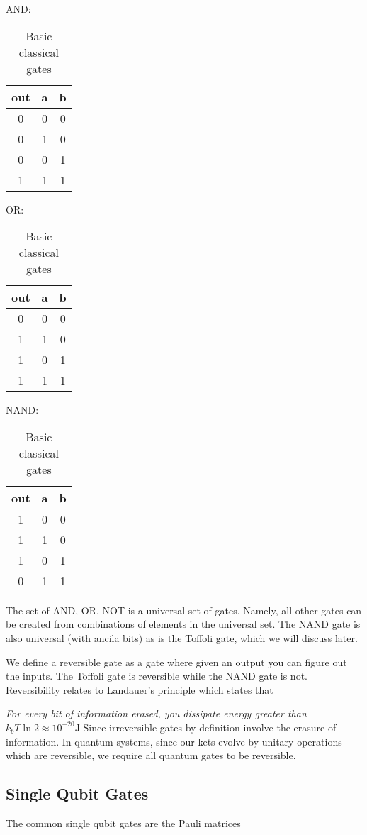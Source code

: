 \documentclass[11pt]{article} %
\begin{document}
\begin{table}
    \centering
    AND: 
    \begin{tabular}{c|c c}
        out & a & b\\\hline
        0 & 0 & 0\\
        0 & 1 & 0\\
        0 & 0 & 1\\
        1 & 1 & 1\\
    \end{tabular}\;\;
    OR: 
    \begin{tabular}{c|c c}
        out & a & b\\\hline
        0 & 0 & 0\\
        1 & 1 & 0\\
        1 & 0 & 1\\
        1 & 1 & 1\\
    \end{tabular}\;\;
    NAND: 
    \begin{tabular}{c|c c}
        out & a & b\\\hline
        1 & 0 & 0\\
        1 & 1 & 0\\
        1 & 0 & 1\\
        0 & 1 & 1\\
    \end{tabular}
    \caption{Basic classical gates}
    \label{basic_gates}
\end{table}

The set of {AND, OR, NOT} is a universal set of gates. Namely, all other gates can be created from combinations of elements in the universal set. The NAND gate is also universal (with ancila bits) as is the Toffoli gate, which we will discuss later.

We define a reversible gate as a gate where given an output you can figure out the inputs. The Toffoli gate is reversible while the NAND gate is not. Reversibility relates to Landauer's principle which states that

\textit{For every bit of information erased, you dissipate energy greater than $k_bT\ln2 \approx 10^{-20} \textrm{J}$}
Since irreversible gates by definition involve the erasure of information. In quantum systems, since our kets evolve by unitary operations which are reversible, we require all quantum gates to be reversible.

\subsection{Single Qubit Gates}
The common single qubit gates are the Pauli matrices
\end{document}
